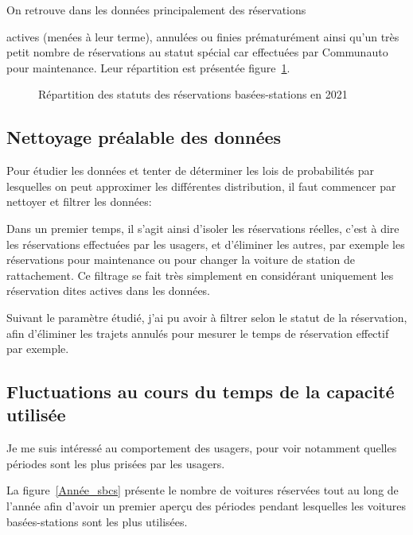 \documentclass[12pt,a4paper]{article}
\theoremstyle{definition}
\begin{document}
On retrouve dans les données principalement des réservations {actives (menées à leur terme), annulées ou finies prématurément ainsi qu'un très petit nombre de réservations au statut spécial car effectuées par Communauto pour maintenance. Leur répartition est présentée figure~\ref{Répartition}.

\begin{figure}[!h]
\centering
{}
\caption{Répartition des statuts des réservations basées-stations en 2021}
\label{Répartition}
\end{figure}
 	
 	
\subsection{Nettoyage préalable des  données}
Pour étudier les données et tenter de déterminer les lois de probabilités par lesquelles on peut approximer les différentes distribution, il faut commencer par nettoyer et filtrer les données:

Dans un premier temps, il s'agit ainsi d'isoler les réservations réelles, c'est à dire les réservations effectuées par les usagers, et d'éliminer les autres, par exemple les réservations pour maintenance ou pour changer la voiture de station de rattachement.
Ce filtrage se fait très simplement en considérant uniquement les réservation dites actives dans les données.	

Suivant le paramètre étudié, j'ai pu avoir à filtrer selon le statut de la réservation, afin d'éliminer les trajets annulés pour mesurer le temps de réservation effectif par exemple.



\subsection{Fluctuations au cours du temps de la capacité utilisée}


Je me suis intéressé au comportement des usagers, pour voir notamment quelles périodes sont les plus prisées par les usagers.

La figure~\ref{Année_sbcs} présente le nombre de voitures réservées tout au long de l'année afin d'avoir un premier aperçu des périodes pendant lesquelles les voitures basées-stations sont les plus utilisées. 

}
\end{document}
